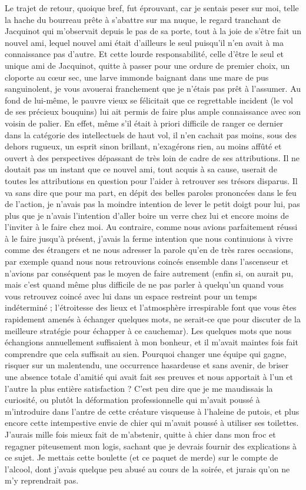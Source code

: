 Le trajet de retour, quoique bref, fut éprouvant, car je sentais peser sur moi, telle la hache du bourreau prête à s’abattre sur ma nuque, le regard tranchant de Jacquinot qui m’observait depuis le pas de sa porte, tout à la joie de s’être fait un nouvel ami, lequel nouvel ami était d’ailleurs le seul puisqu’il n’en avait à ma connaissance pas d’autre. Et cette lourde responsabilité, celle d’être le seul et unique ami de Jacquinot, quitte à passer pour une ordure de premier choix, un cloporte au cœur sec, une larve immonde baignant dans une mare de pus sanguinolent, je vous avouerai franchement que je n’étais pas prêt à l’assumer. Au fond de lui-même, le pauvre vieux se félicitait que ce regrettable incident (le vol de ses précieux bouquins) lui ait permis de faire plus ample connaissance avec son voisin de palier. En effet, même s’il était à priori difficile de ranger ce dernier dans la catégorie des intellectuels de haut vol, il n’en cachait pas moins, sous des dehors rugueux, un esprit sinon brillant, n’exagérons rien, au moins affûté et ouvert à des perspectives dépassant de très loin de cadre de ses attributions. Il ne doutait pas un instant que ce nouvel ami, tout acquis à sa cause, userait de toutes les attributions en question pour l’aider à retrouver ses trésors disparus. Il va sans dire que pour ma part, en dépit des belles paroles prononcées dans le feu de l’action, je n’avais pas la moindre intention de lever le petit doigt pour lui, pas plus que je n’avais l’intention d’aller boire un verre chez lui et encore moins de l’inviter à le faire chez moi. Au contraire, comme nous avions parfaitement réussi à le faire jusqu’à présent, j’avais la ferme intention que nous continuions à vivre comme des étrangers et ne nous adresser la parole qu’en de très rares occasions, par exemple quand nous nous retrouvions coincés ensemble dans l’ascenseur et n’avions par conséquent pas le moyen de faire autrement (enfin si, on aurait pu, mais c’est quand même plus difficile de ne pas parler à quelqu’un quand vous vous retrouvez coincé avec lui dans un espace restreint pour un temps indéterminé ; l’étroitesse des lieux et l’atmosphère irrespirable font que vous êtes rapidement amenés à échanger quelques mots, ne serait-ce que pour discuter de la meilleure stratégie pour échapper à ce cauchemar). Les quelques mots que nous échangions annuellement suffisaient à mon bonheur, et il m’avait maintes fois fait comprendre que cela suffisait au sien. Pourquoi changer une équipe qui gagne, risquer sur un malentendu, une occurrence hasardeuse et sans avenir, de briser une absence totale d’amitié qui avait fait ses preuves et nous apportait à l’un et l’autre la plus entière satisfaction ? C’est peu dire que je me maudissais la curiosité, ou plutôt la déformation professionnelle qui m’avait poussé à m’introduire dans l’antre de cette créature visqueuse à l’haleine de putois, et plus encore cette intempestive envie de chier qui m’avait poussé à utiliser ses toilettes. J’aurais mille fois mieux fait de m’abstenir, quitte à chier dans mon froc et regagner piteusement mon logis, sachant que je devrais fournir des explications à ce sujet. Je mettais cette boulette (et ce paquet de merde) sur le compte de l’alcool, dont j’avais quelque peu abusé au cours de la soirée, et jurais qu’on ne m’y reprendrait pas.

